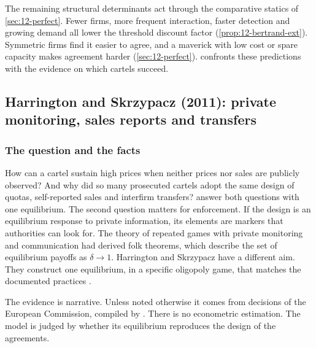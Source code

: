 The remaining structural determinants act through the comparative statics of \cref{sec:12-perfect}. Fewer firms,
more frequent interaction, faster detection and growing demand all lower the threshold discount factor
(\cref{prop:12-bertrand-ext}). Symmetric firms find it easier to agree, and a maverick with low cost or spare
capacity makes agreement harder (\cref{sec:12-perfect}).  confronts these predictions with the
evidence on which cartels succeed.

\subsection{Harrington and Skrzypacz (2011): private monitoring, sales reports and transfers}\label{sec:12-hs}

\subsubsection{The question and the facts}

How can a cartel sustain high prices when neither prices nor sales are publicly observed? And why did so many
prosecuted cartels adopt the same design of quotas, self-reported sales and interfirm transfers?
\citet{HarringtonSkrzypacz2011} answer both questions with one equilibrium. The second question matters for
enforcement. If the design is an equilibrium response to private information, its elements are markers that
authorities can look for. The theory of repeated games with private monitoring and communication
\citep{Compte1998,KandoriMatsushima1998} had derived folk theorems, which describe the set of equilibrium payoffs as
$\delta \to 1$. Harrington and Skrzypacz have a different aim. They construct one equilibrium, in a specific
oligopoly game, that matches the documented practices \citep[p.~2428]{HarringtonSkrzypacz2011}.

The evidence is narrative. Unless noted otherwise it comes from decisions of the European Commission, compiled by
\citet{Harrington2006}. There is no econometric estimation. The model is judged by whether its equilibrium
reproduces the design of the agreements.

